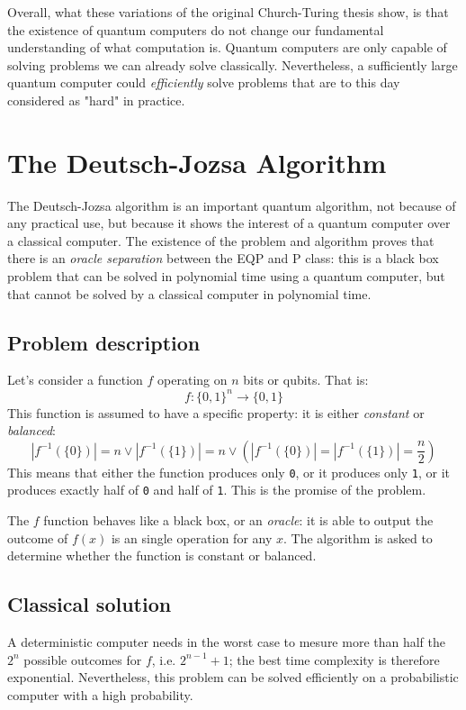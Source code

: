 \documentclass[12pt,a4paper]{article}
\theoremstyle{plain}
\theoremstyle{definition}
\begin{document}
Overall, what these variations of the original Church-Turing thesis show, is that the existence of quantum computers do not change our fundamental understanding of what computation is. Quantum computers are only capable of solving problems we can already solve classically. Nevertheless, a sufficiently large quantum computer could \emph{efficiently} solve problems that are to this day considered as "hard" in practice. 

\section{The Deutsch-Jozsa Algorithm}
The Deutsch-Jozsa algorithm\cite{deutsch-jozsa} is an important quantum algorithm, not because of any practical use, but because it shows the interest of a quantum computer over a classical computer. The existence of the problem and algorithm proves that there is an \emph{oracle separation} between the EQP and P class: this is a black box problem that can be solved in polynomial time using a quantum computer, but that cannot be solved by a classical computer in polynomial time.

\subsection{Problem description}
Let's consider a function $f$ operating on $n$ bits or qubits. That is:
\begin{equation*}
    f : \{ 0, 1 \}^n \to \{ 0, 1 \}
\end{equation*}
This function is assumed to have a specific property: it is either \emph{constant} or \emph{balanced}:
\begin{equation*}
    |f^{-1}(\{0\})| = n \lor |f^{-1}(\{1\})| = n \lor \left(|f^{-1}(\{0\})| = |f^{-1}(\{1\})| = \frac{n}{2}\right)
\end{equation*}
This means that either the function produces only \texttt{0}, or it produces only \texttt{1}, or it produces exactly half of \texttt{0} and half of \texttt{1}. This is the promise of the problem.

The $f$ function behaves like a black box, or an \emph{oracle}: it is able to output the outcome of $f(x)$ is an single operation for any $x$. The algorithm is asked to determine whether the function is constant or balanced.

\subsection{Classical solution}
A deterministic computer needs in the worst case to mesure more than half the $2^n$ possible outcomes for $f$, i.e. $2^{n-1}+1$; the best time complexity is therefore exponential. Nevertheless, this problem can be solved efficiently on a probabilistic computer with a high probability.
\end{document}
